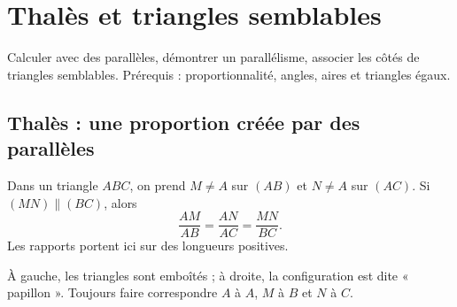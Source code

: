 \documentclass[../cours_3e.tex]{subfiles}
\begin{document}
\setcounter{chapter}{13}
\chapter{Thalès et triangles semblables}
\label{ch:thales}
\begin{objectif}
Calculer avec des parallèles, démontrer un parallélisme, associer les côtés de triangles semblables. Prérequis : proportionnalité, angles, aires et triangles égaux.
\end{objectif}
\section{Thalès : une proportion créée par des parallèles}
\begin{theoreme}
Dans un triangle $ABC$, on prend $M\ne A$ sur $(AB)$ et $N\ne A$ sur $(AC)$. Si $(MN)\parallel(BC)$, alors
\[\frac{AM}{AB}=\frac{AN}{AC}=\frac{MN}{BC}.\]
Les rapports portent ici sur des longueurs positives.
\end{theoreme}
\begin{center}
\end{center}
À gauche, les triangles sont emboîtés ; à droite, la configuration est dite « papillon ». Toujours faire correspondre $A$ à $A$, $M$ à $B$ et $N$ à $C$.
\end{document}
